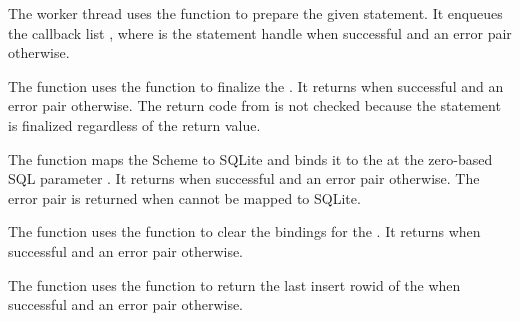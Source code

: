 The worker thread uses the  function to
prepare the given  statement. It enqueues the callback list
, where  is the
statement handle when successful and an error pair otherwise.

\begin{function}
\end{function}

The  function uses the
 function to finalize the .  It
returns  when successful and an error pair otherwise. The
return code from  is not checked because the
statement is finalized regardless of the return value.

\begin{function}
\end{function}

The  function maps the Scheme 
to SQLite and binds it to the  at the zero-based SQL
parameter .  It returns  when successful and an
error pair otherwise. The error pair  is returned when  cannot be
mapped to SQLite.

\begin{function}
\end{function}

The  function uses the
 function to clear the bindings for the
. It returns  when successful and an error
pair otherwise.

\begin{function}
\end{function}

The  function uses the
 function to return the last insert
rowid of the  when successful and an error pair
otherwise.

